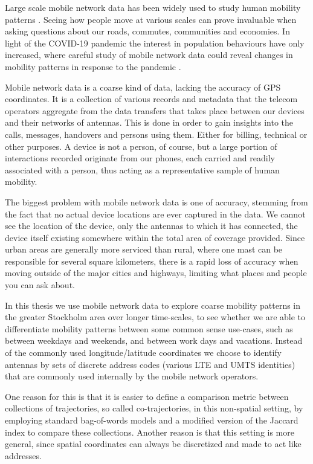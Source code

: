 \documentclass[../main.tex]{subfiles}
\begin{document}
Large scale mobile network data has been widely used to study human mobility patterns \cite{gonzalez2008understanding}. Seeing how people move at various scales can prove invaluable 
when asking questions about our roads, commutes, communities and economies. In light of the
COVID-19 pandemic the interest in population behaviours have only increased, where careful study of mobile network data could reveal
changes in mobility patterns in response to the pandemic \cite{toger2021mobility}.

Mobile network data is a coarse kind of data, lacking the accuracy of GPS coordinates. It is a 
collection of various records and metadata that the telecom operators aggregate from the data transfers 
that takes place between our devices and their networks of antennas. This is done in order to gain insights into 
the calls, messages, handovers and persons using them. Either for billing, technical or other purposes.
A device is not a person, of course, but a large portion of interactions recorded originate
from our phones, each carried and readily associated with a person, thus acting as a representative
sample of human mobility.

The biggest problem with mobile network data is one of accuracy, stemming from the fact that no actual device locations are ever captured in the data. We cannot see the location of the device, only the antennas to which it has connected, the device itself existing somewhere within the total area of coverage provided. Since urban areas are generally more serviced than rural, where one mast can 
be responsible for several square kilometers, there is a rapid loss of accuracy when moving outside of the major cities and highways, limiting what places and people you can ask about.

In this thesis we use mobile network data to explore coarse mobility patterns in the greater Stockholm area over longer time-scales, to see whether we are able to differentiate mobility patterns between some common sense use-cases, such as between weekdays and weekends, and between work days and vacations. Instead of the commonly used longitude/latitude coordinates we choose to identify antennas
by sets of discrete address codes (various LTE and UMTS identities) that are commonly used internally by the mobile network operators.

One reason for this is that it is easier to define a comparison metric between collections of trajectories, so called co-trajectories, in this non-spatial setting, by employing standard bag-of-words models and a modified version of the Jaccard index to compare these collections. Another reason is that this setting is more general, since spatial coordinates can always be discretized and made to act like addresses.
\end{document}
